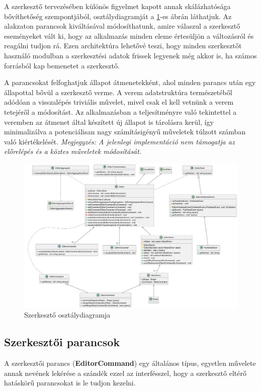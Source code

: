 A szerkesztő tervezésében különös figyelmet kapott annak skálázhatósága bővíthetőség szempontjából, osztálydiagramját a \ref{fig:class_editor-1}-es ábrán láthatjuk. Az alakzaton parancsok kiváltásával módosíthatunk, amire válaszul a szerkesztő eseményeket vált ki, hogy az alkalmazás minden eleme értesüljön a változásról és reagálni tudjon rá. Ezen architektúra lehetővé teszi, hogy minden szerkesztőt használó modulban a szerkesztési adatok frissek legyenek még akkor is, ha számos forrásból kap bemenetet a szerkesztő.

A parancsokat felfoghatjuk állapot átmenetekként, ahol minden parancs után egy állapottal bővül a szerkesztő verme. A verem adatstruktúra természetéből adódóan a visszalépés triviális művelet, mivel csak el kell vetnünk a verem tetejéről a módosítást. Az alkalmazásban a teljesítményre való tekintettel a veremben az átmenet által készített új állapot is tárolásra kerül, így minimalizálva a potenciálisan nagy számításigényű műveletek túlzott számban való kiértékelését. \textit{Megjegyzés: A jelenlegi implementáció nem támogatja az előrelépés és a köztes műveletek módosítását.}

\begin{figure}[H]
	\centering
	\includegraphics[width=1\linewidth]{images/class_editor.png}
	\caption{Szerkesztő osztálydiagramja}
	\label{fig:class_editor-1}
\end{figure}


\subsection{Szerkesztői parancsok}

A szerkesztői parancs (\textbf{EditorCommand}) egy általános típus, egyetlen művelete annak nevének lekérése a szándék ezzel az interfésszel, hogy a szerkesztő eltérő hatáskörű parancsokat is le tudjon kezelni.

